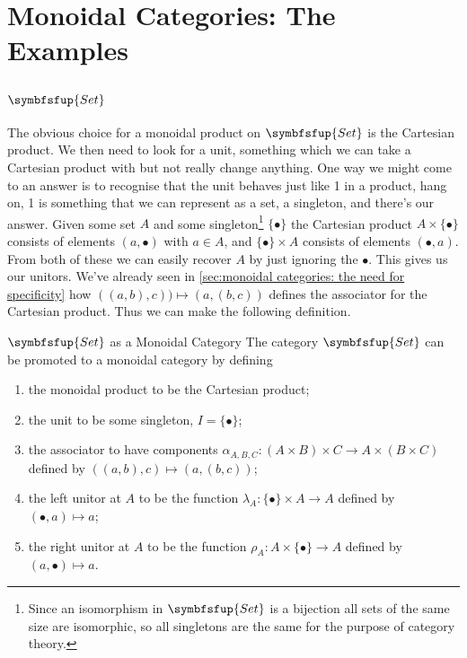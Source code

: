 \documentclass[fleqn]{NotesClass}
\makeatletter
\newcommand{\c@egory}[1]{\symbfsfup{#1}}
\newcommand{\Set}{\c@egory{Set}}
\makeatother
\begin{document}
    \section{Monoidal Categories: The Examples}
    \subsection{\texorpdfstring{\(\Set\)}{Set}}
    The obvious choice for a monoidal product on \(\Set\) is the Cartesian product.
    We then need to look for a unit, something which we can take a Cartesian product with but not really change anything.
    One way we might come to an answer is to recognise that the unit behaves just like 1 in a product, hang on, 1 is something that we can represent as a set, a singleton, and there's our answer.
    Given some set \(A\) and some singleton\footnote{Since an isomorphism in \(\Set\) is a bijection all sets of the same size are isomorphic, so all singletons are the same for the purpose of category theory.} \(\{\bullet\}\) the Cartesian product \(A \times \{\bullet\}\) consists of elements \((a, \bullet)\) with \(a \in A\), and \(\{\bullet\} \times A\) consists of elements \((\bullet, a)\).
    From both of these we can easily recover \(A\) by just ignoring the \(\bullet\).
    This gives us our unitors.
    We've already seen in \cref{sec:monoidal categories: the need for specificity} how \(((a, b), c)) \mapsto (a, (b, c))\) defines the associator for the Cartesian product.
    Thus we can make the following definition.
    
    \begin{dfn}{{\normalsize\(\Set\)} as a Monoidal Category}{}
        The category \(\Set\)\index{Set@\(\Set\)!as a monoidal category} can be promoted to a monoidal category by defining
        \begin{enumerate}
            \item the monoidal product to be the Cartesian product;
            \item the unit to be some singleton, \(I = \{\bullet\}\);
            \item the associator to have components \(\alpha_{A, B, C} \colon (A \times B) \times C \to A \times (B \times C)\) defined by \(((a, b), c) \mapsto (a, (b, c))\);
            \item the left unitor at \(A\) to be the function \(\lambda_A \colon \{\bullet\} \times A \to A\) defined by \((\bullet, a) \mapsto a\);
            \item the right unitor at \(A\) to be the function \(\rho_A \colon A \times \{\bullet\} \to A\) defined by \((a, \bullet) \mapsto a\).
        \end{enumerate}
    \end{dfn}
    
\end{document}

